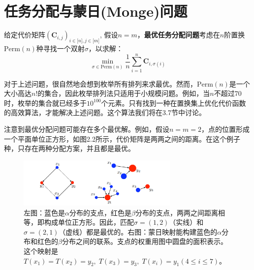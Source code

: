\documentclass[cn,10pt,math=newtx,citestyle=gb7714-2015,bibstyle=gb7714-2015]{elegantbook}
\begin{document}
\section{任务分配与蒙日(Monge)问题}

给定代价矩阵$(\mathbf{C}_{i,j})_{i\in \mathbb{[}n\mathbb{]},j\in \mathbb{[}m\mathbb{]}}$, 假设$n=m$，\textbf{最优任务分配问题}考虑在$n$阶置换$\text{Perm}(n)$种寻找一个双射$\sigma$，以求解：
\begin{equation}
    \label{2.2}
    \min\limits_{\sigma\in\text{Perm}(n)} \frac{1}{n}\sum_{i=1}^n \mathbf{C}_{i,\sigma(i)}
\end{equation}

对于上述问题，很自然地会想到枚举所有排列来求最优。然而，$\text{Perm}(n)$是一个大小高达$n!$的集合，因此枚举排列法只适用于小规模问题。例如，当$n$不超过$70$时，枚举的集合就已经多于$10^{100}$个元素。只有找到一种在置换集上优化代价函数的高效算法，才能解决上述问题。这个算法我们将在3.7节中讨论。

\begin{postulate}[唯一性]
注意到最优分配问题可能存在多个最优解。例如，假设$n=m=2$，点的位置形成一个平面单位正方形，如图2.2所示，代价矩阵是两两之间的距离。在这个例子种，只存在两种分配方案，并且都是最优。
\end{postulate}

\begin{figure}[H]
    \centering
    \includegraphics[width=0.7\textwidth]{figure/fig2.2.png}
    \caption{左图：蓝色是$\alpha$分布的支点，红色是$\beta$分布的支点，两两之间距离相等，即构成单位正方形。因此，匹配$\sigma=(1,2)$（实线）和$\sigma=(2,1)$（虚线）都是最优的。右图：蒙日映射能构建蓝色的$\alpha$分布和红色的$\beta$分布之间的联系。支点的权重用图中圆盘的面积表示。这个映射是$T(x_1)=T(x_2)=y_2,\;T(x_3)=y_3,\;T(x_i)=y_1(4\leq i\leq 7)$。}
    \label{图2.2}
\end{figure}
\end{document}
